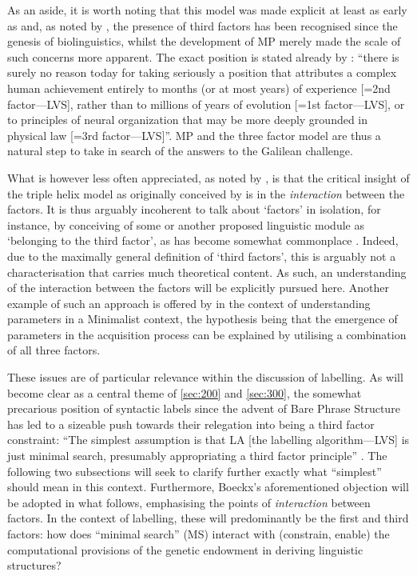 As an aside, it is worth noting that this model was made explicit at least as early as \textcite[105]{ChomskyN_2004} and, as noted by \textcite[xi]{ChomskyN_2006}, the presence of third factors has been recognised since the genesis of biolinguistics, whilst the development of MP merely made the scale of such concerns more apparent. The exact position is stated already by \textcite[59]{ChomskyN_1965}: ``there is surely no reason today for taking seriously a position that attributes a complex human achievement entirely to months (or at most years) of experience [=2nd factor---LVS], rather than to millions of years of evolution [=1st factor---LVS], or to principles of neural organization that may be more deeply grounded in physical law [=3rd factor---LVS]''. MP and the three factor model are thus a natural step to take in search of the answers to the Galilean challenge.

What is however less often appreciated, as noted by \textcite{BoeckxC_2014a}, is that the critical insight of the triple helix model as originally conceived by \textcite{LewontinRC_2000} is in the \emph{interaction} between the factors. It is thus arguably incoherent to talk about `factors' in isolation, for instance, by conceiving of some or another proposed linguistic module as `belonging to the third factor', as has become somewhat commonplace \parencite[see][]{GallegoAJ_2011}. Indeed, due to the maximally general definition of `third factors', this is arguably not a characterisation that carries much theoretical content. As such, an understanding of the interaction between the factors will be explicitly pursued here. Another example of such an approach is offered by \textcite{RobertsI_2019} in the context of understanding parameters in a Minimalist context, the hypothesis being that the emergence of parameters in the acquisition process can be explained by utilising a combination of all three factors.

These issues are of particular relevance within the discussion of labelling. As will become clear as a central theme of \autoref{sec:200} and \autoref{sec:300}, the somewhat precarious position of syntactic labels since the advent of Bare Phrase Structure \parencite{ChomskyN_1994} has led to a sizeable push towards their relegation into being a third factor constraint: ``The simplest assumption is that LA [the labelling algorithm---LVS] is just minimal search, presumably appropriating a third factor principle'' \parencite[43]{ChomskyN_2013}. The following two subsections will seek to clarify further exactly what ``simplest'' should mean in this context. Furthermore, Boeckx's aforementioned objection will be adopted in what follows, emphasising the points of \emph{interaction} between factors. In the context of labelling, these will predominantly be the first and third factors: how does ``minimal search'' (MS) interact with (constrain, enable) the computational provisions of the genetic endowment in deriving linguistic structures?

